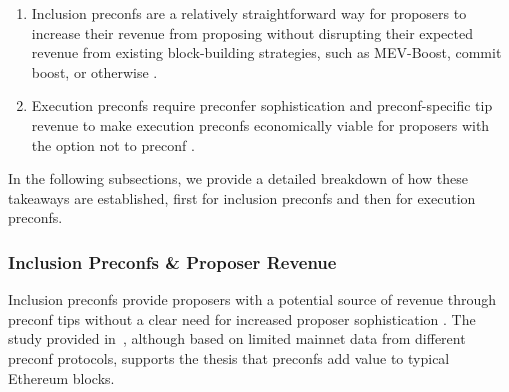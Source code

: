 \documentclass[a4paper]{article}
\theoremstyle{boldstyle}
\begin{document}
     \begin{enumerate}
         \item Inclusion preconfs are a relatively straightforward way for proposers to increase their revenue from proposing without disrupting their expected revenue from existing block-building strategies, such as MEV-Boost, commit boost, or otherwise \cite{W:APricingModelforInclusionPreconfirmations,W:PricingTransactionsforPreconfirmation}.
         \item Execution preconfs require preconfer sophistication and preconf-specific tip revenue to make execution preconfs economically viable for proposers with the option not to preconf \cite{W:PreconfirmationsundertheNOlens,W:EstimatingtheRevenuefromIndependentSub-SlotAuctionPreconfirmations,W:AnalysingExpectedProposerRevenuefromPreconfirmations}. 
     \end{enumerate}

    In the following subsections, we provide a detailed breakdown of how these takeaways are established, first for inclusion preconfs and then for execution preconfs. 
    
    \subsubsection{Inclusion Preconfs \& Proposer Revenue}
\label{inclusion_revenue}
    Inclusion preconfs provide proposers with a potential source of revenue through preconf tips without a clear need for increased proposer sophistication
    \cite{W:APricingModelforInclusionPreconfirmations, W:PricingTransactionsforPreconfirmation, W:MeasuringValidatorEconomics}. The study provided in~\cite{W:MeasuringValidatorEconomics}, although based on limited mainnet data from different preconf protocols, supports the thesis that preconfs add value to typical Ethereum blocks.
    
\end{document}
